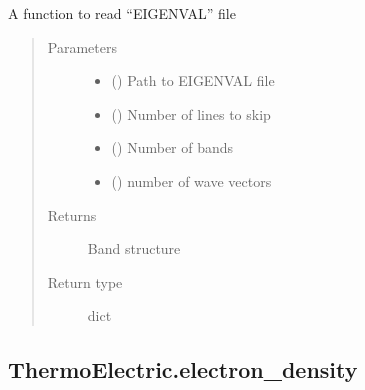 \documentclass[letterpaper,10pt,english]{sphinxmanual}
\begin{document}
\begin{fulllineitems}
\label{\detokenize{autosummary/ThermoElectric.band_structure:ThermoElectric.band_structure}}
\sphinxAtStartPar
A function to read “EIGENVAL” file
\begin{quote}\begin{description}
\item[{Parameters}] \leavevmode\begin{itemize}
\item {} 
\sphinxAtStartPar
{} () \textendash{} Path to EIGENVAL file

\item {} 
\sphinxAtStartPar
{} () \textendash{} Number of lines to skip

\item {} 
\sphinxAtStartPar
{} () \textendash{} Number of bands

\item {} 
\sphinxAtStartPar
{} () \textendash{} number of wave vectors

\end{itemize}

\item[{Returns}] \leavevmode
\sphinxAtStartPar
{} \textendash{} Band structure

\item[{Return type}] \leavevmode
\sphinxAtStartPar
dict

\end{description}\end{quote}

\end{fulllineitems}



\subsection{ThermoElectric.electron\_density}
\label{\detokenize{autosummary/ThermoElectric.electron_density:thermoelectric-electron-density}}\label{\detokenize{autosummary/ThermoElectric.electron_density::doc}}
\end{document}
